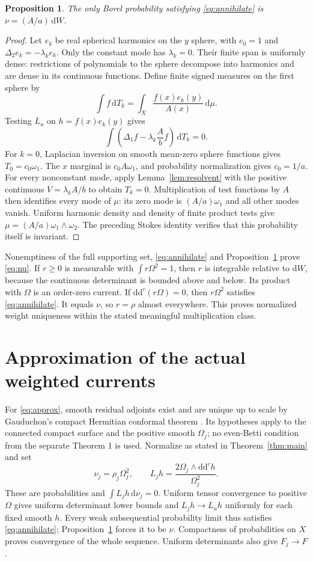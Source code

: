 \documentclass[11pt]{article}
\newtheorem{proposition}[theorem]{Proposition}
\newcommand{\ddc}{\mathrm{d}\mathrm{d}^c}
\begin{document}
\begin{proposition}\label{prop:invariant}
The only Borel probability satisfying \eqref{eq:annihilate} is
$\nu=(A/a)\,\mathrm{d}W$.
\end{proposition}
\begin{proof}
Let $e_k$ be real spherical harmonics on the $y$ sphere, with $e_0=1$ and
$\Delta_2e_k=-\lambda_ke_k$. Only the constant mode has $\lambda_k=0$.
Their finite span is uniformly dense: restrictions of polynomials to the
sphere decompose into harmonics and are dense in its continuous functions.
Define finite signed measures on the first sphere by
\[
 \int f\,\mathrm{d}T_k
 =\int_X\frac{f(x)e_k(y)}{A(x)}\,\mathrm{d}\mu.
\]
Testing $L_u$ on $h=f(x)e_k(y)$ gives
\[
 \int\left(\Delta_1f-\lambda_k\frac A b f\right)\,\mathrm{d}T_k=0.
\]
For $k=0$, Laplacian inversion on smooth mean-zero sphere functions gives
$T_0=c_0\omega_1$. The $x$ marginal is $c_0A\omega_1$, and probability
normalization gives $c_0=1/a$. For every nonconstant mode, apply
Lemma~\ref{lem:resolvent} with the positive continuous $V=\lambda_k A/b$
to obtain $T_k=0$. Multiplication of test functions by $A$ then identifies
every mode of $\mu$: its zero mode is $(A/a)\omega_1$ and all other
modes vanish. Uniform harmonic density and density of finite product tests
give $\mu=(A/a)\omega_1\wedge\omega_2$. The preceding Stokes identity
verifies that this probability itself is invariant.
\end{proof}

Nonemptiness of the full supporting set, \eqref{eq:annihilate} and
Proposition~\ref{prop:invariant} prove \eqref{eq:nu}.
If $r\ge0$ is measurable with $\int r\Omega^2=1$, then $r$ is integrable
relative to $\mathrm{d}W$, because the continuous determinant is bounded
above and below. Its product with $\Omega$ is an order-zero current.
If $\ddc(r\Omega)=0$, then $r\Omega^2$ satisfies \eqref{eq:annihilate}.
It equals $\nu$, so $r=\rho$ almost everywhere. This proves normalized
weight uniqueness within the stated meaningful multiplication class.

\section{Approximation of the actual weighted currents}

For \eqref{eq:approx}, smooth residual adjoints exist and are unique
up to scale by Gauduchon's compact Hermitian conformal theorem
\cite[Section 3, Theorem 2 and its proof]{Gau}. Its hypotheses apply
to the connected compact surface and the positive smooth $\Omega_j$;
no even-Betti condition from the separate Theorem 1 is used.
Normalize as stated in Theorem~\ref{thm:main} and set
\[
 \nu_j=\rho_j\Omega_j^2,
 \qquad L_jh=\frac{2\Omega_j\wedge\ddc h}{\Omega_j^2}.
\]
These are probabilities and $\int L_jh\,\mathrm{d}\nu_j=0$.
Uniform tensor convergence to positive $\Omega$ gives uniform determinant
lower bounds and $L_jh\to L_uh$ uniformly for each fixed smooth $h$.
Every weak subsequential probability limit thus satisfies
\eqref{eq:annihilate}; Proposition~\ref{prop:invariant} forces it to be
$\nu$. Compactness of probabilities on $X$ proves convergence of the
whole sequence. Uniform determinants also give $F_j\to F$.
\end{document}
